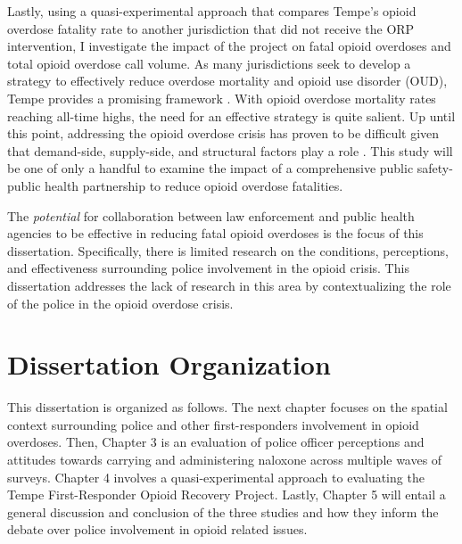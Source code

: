Lastly, using a quasi-experimental approach that compares Tempe’s opioid overdose fatality rate to another jurisdiction that did not receive the ORP intervention, I investigate the impact of the project on fatal opioid overdoses and total opioid overdose call volume. As many jurisdictions seek to develop a strategy to effectively reduce overdose mortality and opioid use disorder (OUD), Tempe provides a promising framework \parencite{white_moving_2021}. With opioid overdose mortality rates reaching all-time highs, the need for an effective strategy is quite salient. Up until this point, addressing the opioid overdose crisis has proven to be difficult given that demand-side, supply-side, and structural factors play a role \parencite{feldmeyer_community_2022}. This study will be one of only a handful to examine the impact of a comprehensive public safety-public health partnership to reduce opioid overdose fatalities.

The \textit{potential} for collaboration between law enforcement and public health agencies to be effective in reducing fatal opioid overdoses is the focus of this dissertation. Specifically, there is limited research on the conditions, perceptions, and effectiveness surrounding police involvement in the opioid crisis. This dissertation addresses the lack of research in this area by contextualizing the role of the police in the opioid overdose crisis.

\section{\centering Dissertation Organization}

This dissertation is organized as follows. The next chapter focuses on the spatial context surrounding police and other first-responders involvement in opioid overdoses. Then, Chapter 3 is an evaluation of police officer perceptions and attitudes towards carrying and administering naloxone across multiple waves of surveys. Chapter 4 involves a quasi-experimental approach to evaluating the Tempe First-Responder Opioid Recovery Project. Lastly, Chapter 5 will entail a general discussion and conclusion of the three studies and how they inform the debate over police involvement in opioid related issues.
